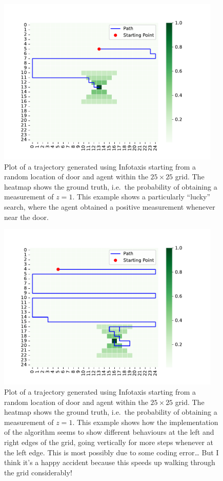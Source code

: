 \begin{figure}[h]
    \centering
    \includegraphics[width=0.95\textwidth]{path_1.pdf}
    \vspace{-5mm}
    \caption{Plot of a trajectory generated using Infotaxis starting from a random location of door and agent within the $25 \times 25$ grid.
    The heatmap shows the ground truth, i.e.~the probability of obtaining a measurement of $z=1$.
    This example shows a particularly ``lucky'' search, where the agent obtained a positive measurement whenever near the door.}
    \label{fig:path1}
\end{figure}
\begin{figure}[h]
    \centering
    \includegraphics[width=0.95\textwidth]{path_2.pdf}
    \vspace{-5mm}
    \caption{Plot of a trajectory generated using Infotaxis starting from a random location of door and agent within the $25 \times 25$ grid.
    The heatmap shows the ground truth, i.e.~the probability of obtaining a measurement of $z=1$.
    This example shows how the implementation of the algorithm seems to show different behaviours at the left and right edges of the grid, 
    going vertically for more steps whenever at the left edge. This is most possibly due to some coding error\ldots 
    But I think it's a happy accident because this speeds up walking through the grid considerably!}
    \label{fig:path2}
\end{figure}
